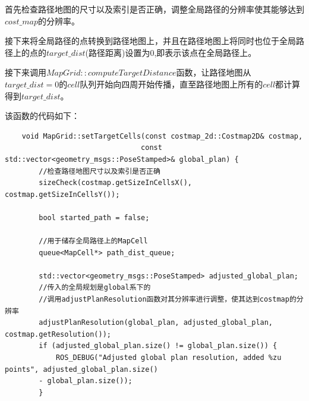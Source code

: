 \documentclass[9pt, oneside]{book}
\begin{document}
首先检查路径地图的尺寸以及索引是否正确，调整全局路径的分辨率使其能够达到$cost\_map$的分辨率。

接下来将全局路径的点转换到路径地图上，并且在路径地图上将同时也位于全局路径上的点的$target\_dist$(路径距离)设置为0,即表示该点在全局路径上。

接下来调用$MapGrid::computeTargetDistance$函数，让路径地图从$target\_dist=0$的$cell$队列开始向四周开始传播，直至路径地图上所有的$cell$都计算得到$target\_dist$。

该函数的代码如下：

\footnotesize
\begin{verbatim}
    void MapGrid::setTargetCells(const costmap_2d::Costmap2D& costmap,
                                const std::vector<geometry_msgs::PoseStamped>& global_plan) {
        //检查路径地图尺寸以及索引是否正确
        sizeCheck(costmap.getSizeInCellsX(), costmap.getSizeInCellsY());

        bool started_path = false;

        //用于储存全局路径上的MapCell
        queue<MapCell*> path_dist_queue;

        std::vector<geometry_msgs::PoseStamped> adjusted_global_plan;
        //传入的全局规划是global系下的
        //调用adjustPlanResolution函数对其分辨率进行调整，使其达到costmap的分辨率
        adjustPlanResolution(global_plan, adjusted_global_plan, costmap.getResolution());
        if (adjusted_global_plan.size() != global_plan.size()) {
            ROS_DEBUG("Adjusted global plan resolution, added %zu points", adjusted_global_plan.size() 
        - global_plan.size());
        }


\end{verbatim}
\end{document}
